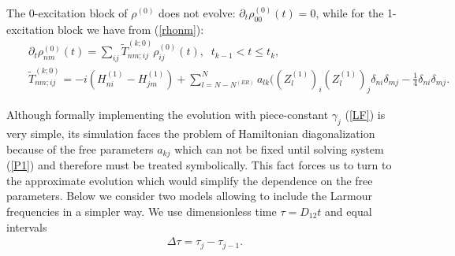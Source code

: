 \documentclass[pra,preprint,showpacs]{revtex4-1}
\begin{document}
The 0-excitation block of $\rho^{(0)}$ does not evolve: $\partial_t \rho^{(0)}_{00}(t)=0$,
while for the 1-excitation block we have from (\ref{rhonm}):
\begin{eqnarray}
\label{rhonm0}
&&
\partial_t\rho^{(0)}_{nm}(t) = \sum_{ij} \tilde T^{(k;0)}_{nm;ij}\rho^{(0)}_{ij}(t), \;\; t_{k-1} < t \le t_k,\\\nonumber
&&
\tilde T^{(k;0)}_{nm;ij}= -i (H^{(1)}_{ni} - H^{(1)}_{jm}) + \sum_{l=N-N^{(ER)}}^N a_{lk} ((Z^{(1)}_l)_i (Z^{(1)}_l)_j \delta_{ni}\delta_{mj} - \frac{1}{4} \delta_{ni}\delta_{mj}.
\end{eqnarray}
\fi

Although  formally  implementing  the evolution with  piece-constant $\gamma_j$  (\ref{LF}) is very simple,
its simulation faces the problem of  Hamiltonian diagonalization because of the free parameters $a_{kj}$ which can not be fixed until solving system (\ref{P1}) {and therefore must be treated symbolically}. This fact  forces us to turn to the approximate evolution which would simplify the dependence on the free parameters.
Below we consider two models allowing to include the Larmour frequencies in a simpler way. We use dimensionless time $\tau = D_{12} t$ and equal intervals
\begin{eqnarray}\label{dtau}
\Delta\tau = \tau_j-\tau_{j-1}.%
\end{eqnarray}
\end{document}
